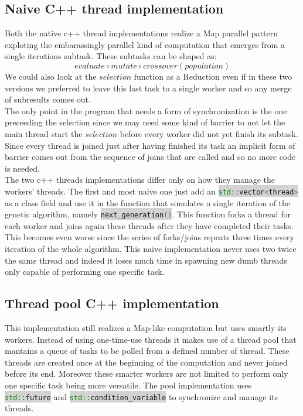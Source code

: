 \documentclass[11pt]{article}
\newcommand{\inlinecode}[2]{\colorbox{lightgray}{\lstinline[language=#1]$#2$}}
\begin{document}
\subsection{Naive C++ thread implementation}
Both the native c++ thread implementations realize a Map parallel pattern exploting the embarassingly parallel kind of computation that emerges from a single iterations subtask. These subtasks can be shaped as:
\[ evaluate \circ mutate \circ crossover (population)\] 
We could also look at the $ selection $ function as a Reduction even if in these two versions we preferred to leave this last task to a single worker and so any merge of subresults comes out.\\
The only point in the program that needs a form of synchronization is the one preceeding the selection since we may need some kind of barrier to not let the main thread start the $ selection $ before every worker did not yet finish its subtask. Since every thread is joined just after having finished its task an implicit form of barrier comes out from the sequence of joins that are called and so no more code is needed.\\
The two c++ threads implementations differ only on how they manage the workers' threads. 
The first and most naive one just add an \inlinecode{C++}{std::vector<thread>} as a class field and use it in the function that simulates a single iteration of the genetic algorithm, namely \inlinecode{C++}{next_generation()}. This function forks a thread for each worker and joins again these threads after they have completed their tasks. This becomes even worse since the series of forks/joins repeats three times every iteration of the whole algorithm. This naive implementation never uses two twice the same thread and indeed it loses much time in spawning new dumb threads only capable of performing one specific task.

\subsection{Thread pool C++ implementation}
This implementation still realizes a Map-like computation but uses smartly its workers. Instead of using one-time-use threads it makes use of a thread pool that mantains a queue of tasks to be polled from a defined number of thread. These threads are created once at the beginning of the computation and never joined before its end. Moreover these smarter workers are not limited to perform only one specific task being more versatile. The pool implementation uses \inlinecode{C++}{std::future} and \inlinecode{C++}{std::condition_variable} to synchronize and manage its threads.
\end{document}
